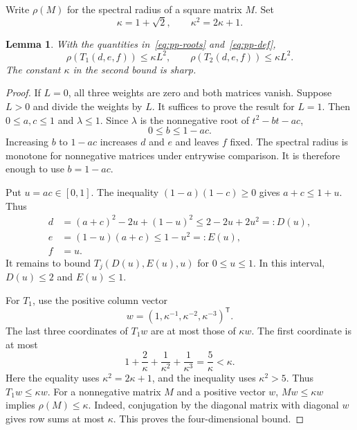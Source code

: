 \documentclass[11pt,a4paper]{article}
\newtheorem{lemma}[theorem]{Lemma}
\theoremstyle{definition}
\theoremstyle{remark}
\newcommand{\T}{\mathsf{T}}
\begin{document}
Write $\rho(M)$ for the spectral radius of a square matrix $M$.
Set
\begin{equation}\label{eq:pp-kappa}
\kappa=1+\sqrt2,\qquad \kappa^2=2\kappa+1.
\end{equation}

\begin{lemma}\label{lem:pp-spectral}
With the quantities in~\eqref{eq:pp-roots} and~\eqref{eq:pp-def},
\[
\rho(T_1(d,e,f))\le\kappa L^2,
\qquad
\rho(T_2(d,e,f))\le\kappa L^2.
\]
The constant $\kappa$ in the second bound is sharp.
\end{lemma}

\begin{proof}
If $L=0$, all three weights are zero and both matrices vanish.
Suppose $L>0$ and divide the weights by $L$.
It suffices to prove the result for $L=1$.
Then $0\le a,c\le1$ and $\lambda\le1$.
Since $\lambda$ is the nonnegative root of $t^2-bt-ac$,
\[
0\le b\le1-ac.
\]
Increasing $b$ to $1-ac$ increases $d$ and $e$ and leaves $f$ fixed.
The spectral radius is monotone for nonnegative matrices under entrywise comparison.
It is therefore enough to use $b=1-ac$.

Put $u=ac\in[0,1]$.
The inequality $(1-a)(1-c)\ge0$ gives $a+c\le1+u$.
Thus
\begin{equation}\label{eq:pp-one-variable}
\begin{aligned}
d&=(a+c)^2-2u+(1-u)^2\le2-2u+2u^2=:D(u),\\
e&=(1-u)(a+c)\le1-u^2=:E(u),\\
f&=u.
\end{aligned}
\end{equation}
It remains to bound $T_j(D(u),E(u),u)$ for $0\le u\le1$.
In this interval, $D(u)\le2$ and $E(u)\le1$.

For $T_1$, use the positive column vector
\[
w=(1,\kappa^{-1},\kappa^{-2},\kappa^{-3})^\T.
\]
The last three coordinates of $T_1w$ are at most those of $\kappa w$.
The first coordinate is at most
\[
1+\frac2\kappa+\frac1{\kappa^2}+\frac1{\kappa^3}
=\frac5\kappa<\kappa.
\]
Here the equality uses $\kappa^2=2\kappa+1$, and the inequality uses $\kappa^2>5$.
Thus $T_1w\le\kappa w$.
For a nonnegative matrix $M$ and a positive vector $w$, $Mw\le\kappa w$ implies $\rho(M)\le\kappa$.
Indeed, conjugation by the diagonal matrix with diagonal $w$ gives row sums at most $\kappa$.
This proves the four-dimensional bound.


\end{proof}
\end{document}
